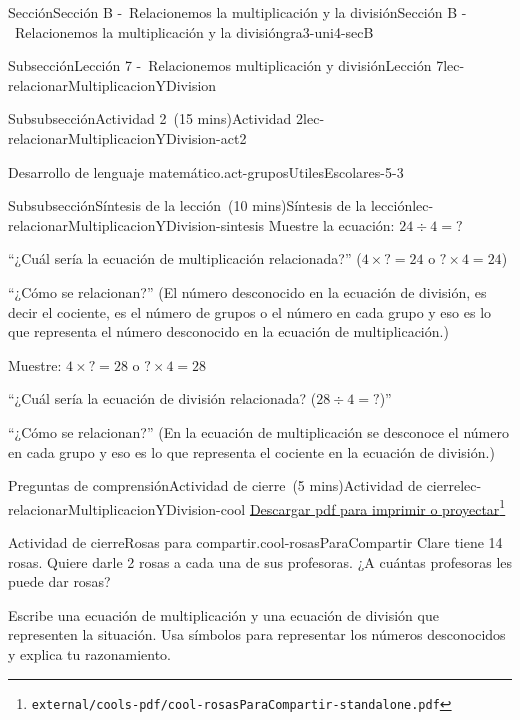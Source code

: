 \documentclass[oneside,10pt,]{article}
\begin{document}
\begin{sectionptx}{Sección}{Sección B -~Relacionemos la multiplicación y la división}{}{Sección B -~Relacionemos la multiplicación y la división}{}{}{gra3-uni4-secB}
\begin{subsectionptx}{Subsección}{Lección 7 -~Relacionemos multiplicación y división}{}{Lección 7}{}{}{lec-relacionarMultiplicacionYDivision}
\begin{subsubsectionptx}{Subsubsección}{Actividad 2~(15 mins)}{}{Actividad 2}{}{}{lec-relacionarMultiplicacionYDivision-act2}
\begin{paragraphs}{Desarrollo de lenguaje matemático.}{act-gruposUtilesEscolares-5-3}
\end{paragraphs}%
\end{subsubsectionptx}
%
%
\typeout{************************************************}
\typeout{************************************************}
%
\begin{subsubsectionptx}{Subsubsección}{Síntesis de la lección~(10 mins)}{}{Síntesis de la lección}{}{}{lec-relacionarMultiplicacionYDivision-sintesis}
Muestre la ecuación: \(24 \div 4 = {?}\)%
\par
``¿Cuál sería la ecuación de multiplicación relacionada?'' (\(4 \times {?} = 24\) o \({?} \times 4 = 24\))%
\par
``¿Cómo se relacionan?'' (El número desconocido en la ecuación de división, es decir el cociente, es el número de grupos o el número en cada grupo y eso es lo que representa el número desconocido en la ecuación de multiplicación.)%
\par
Muestre: \(4 \times {?} = 28\) o \({?} \times 4 = 28\)%
\par
``¿Cuál sería la ecuación de división relacionada? (\(28 \div 4 = {?}\))''%
\par
``¿Cómo se relacionan?'' (En la ecuación de multiplicación se desconoce el número en cada grupo y eso es lo que representa el cociente en la ecuación de división.)%
\end{subsubsectionptx}
%
%
\typeout{************************************************}
\typeout{************************************************}
%
\begin{reading-questions-subsubsection}{Preguntas de comprensión}{Actividad de cierre~(5 mins)}{}{Actividad de cierre}{}{}{lec-relacionarMultiplicacionYDivision-cool}
\href{external/cools-pdf/cool-rosasParaCompartir-standalone.pdf}{Descargar pdf para imprimir o proyectar}\footnote{\nolinkurl{external/cools-pdf/cool-rosasParaCompartir-standalone.pdf}\label{lec-relacionarMultiplicacionYDivision-cool-5}}\begin{project}{Actividad de cierre}{Rosas para compartir.}{cool-rosasParaCompartir}%
Clare tiene 14 rosas. Quiere darle 2 rosas a cada una de sus profesoras. ¿A cuántas profesoras les puede dar rosas?%
\par
Escribe una ecuación de multiplicación y una ecuación de división que representen la situación. Usa símbolos para representar los números desconocidos y explica tu razonamiento.%
\par\smallskip%

\end{project}
\end{reading-questions-subsubsection}
\end{subsectionptx}
\end{sectionptx}
\end{document}
